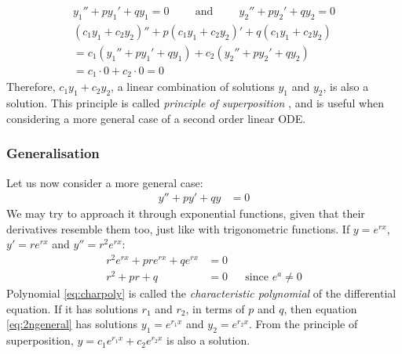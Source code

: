 \documentclass[12pt, a4paper, titlepage]{article}
\theoremstyle{definition}
\numberwithin{equation}{section}
\theoremstyle{definition}
\theoremstyle{definition}
\begin{document}
\begin{gather}
y_1''+py_1'+qy_1=0\hspace{1cm}\text{and}\hspace{1cm}y_2''+py_2'+qy_2=0\\
(c_1y_1+c_2y_2)''+p(c_1y_1+c_2y_2)'+q(c_1y_1+c_2y_2)\\
=c_1(y_1''+py_1'+qy_1)+c_2(y_2''+py_2'+qy_2)\\
=c_1\cdot0+c_2\cdot0=0
\end{gather}
Therefore, $c_1y_1+c_2y_2$, a linear combination of solutions $y_1$ and $y_2$, is also a solution. This principle is called \textit{principle of superposition} {\parencite{superposition}}, and is useful when considering a more general case of a second order linear ODE.

\subsubsection{Generalisation}\label{generalisation}
Let us now consider a more general case:
\begin{align}
y''+py'+qy&=0\label{eq:2ngeneral}
\end{align}
We may try to approach it through exponential functions, given that their derivatives resemble them too, just like with trigonometric functions. If $y=e^{rx}$, $y'=re^{rx}$ and $y''=r^2e^{rx}$:
\begin{align}
r^2e^{rx}+pre^{rx}+qe^{rx}&=0\\
r^2+pr+q&=0&&\text{since $e^a\neq0$}\label{eq:charpoly}
\end{align}
Polynomial \eqref{eq:charpoly} is called the \textit{characteristic polynomial} of the differential equation. \parencite[pp. 102-103]{ode} If it has solutions $r_1$ and $r_2$, in terms of $p$ and $q$, then equation \eqref{eq:2ngeneral} has solutions $y_1=e^{r_1x}$ and $y_2=e^{r_2x}$. From the principle of superposition, $y=c_1e^{r_1x}+c_2e^{r_2x}$ is also a solution.
\end{document}
